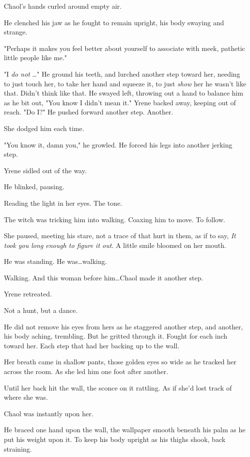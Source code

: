 Chaol's hands curled around empty air.

He clenched his jaw as he fought to remain upright, his body swaying and strange.

"Perhaps it makes you feel better about yourself to associate with meek, pathetic little people like me."

"I \emph{do not} \ldots" He ground his teeth, and lurched another step toward her, needing to just touch her, to take her hand and squeeze it, to just \emph{show} her he wasn't like that.
Didn't think like that.
He swayed left, throwing out a hand to balance him as he bit out, "You know I didn't mean it."
Yrene backed away, keeping out of reach.
"Do I?"
He pushed forward another step.
Another.

She dodged him each time.

"You know it, damn you," he growled.
He forced his legs into another jerking step.

Yrene sidled out of the way.

He blinked, pausing.

Reading the light in her eyes.
The tone.

The witch was tricking him into walking.
Coaxing him to move.
To follow.

She paused, meeting his stare, not a trace of that hurt in them, as if to say, \emph{It took you long enough to figure it out}.
A little smile bloomed on her mouth.

He was standing.
He was\ldots walking.

Walking.
And this woman before him\ldots Chaol made it another step.

Yrene retreated.

Not a hunt, but a dance.

He did not remove his eyes from hers as he staggered another step, and another, his body aching, trembling.
But he gritted through it.
Fought for each inch toward her.
Each step that had her backing up to the wall.

Her breath came in shallow pants, those golden eyes so wide as he tracked her across the room.
As she led him one foot after another.

Until her back hit the wall, the sconce on it rattling.
As if she'd lost track of where she was.

Chaol was instantly upon her.

He braced one hand upon the wall, the wallpaper smooth beneath his palm as he put his weight upon it.
To keep his body upright as his thighs shook, back straining.

